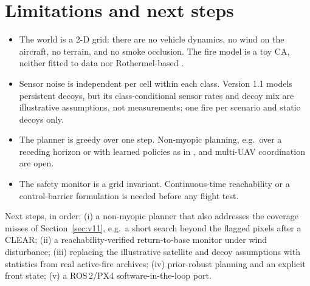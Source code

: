 \documentclass[10pt,a4paper]{article}
\begin{document}
\section{Limitations and next steps}
\begin{itemize}\setlength{\itemsep}{0pt}
\item The world is a 2-D grid: there are no vehicle dynamics, no wind on the aircraft, no terrain, and no smoke occlusion. The fire model is a toy CA, neither fitted to data nor Rothermel-based \citep{rothermel1972}.
\item Sensor noise is independent per cell within each class. Version 1.1 models persistent decoys, but its class-conditional sensor rates and decoy mix are illustrative assumptions, not measurements; one fire per scenario and static decoys only.
\item The planner is greedy over one step. Non-myopic planning, e.g.\ over a receding horizon or with learned policies as in \citet{julian2019}, and multi-UAV coordination are open.
\item The safety monitor is a grid invariant. Continuous-time reachability or a control-barrier formulation is needed before any flight test.
\end{itemize}
Next steps, in order: (i) a non-myopic planner that also addresses the coverage misses of Section~\ref{sec:v11}, e.g.\ a short search beyond the flagged pixels after a CLEAR; (ii) a reachability-verified return-to-base monitor under wind disturbance; (iii) replacing the illustrative satellite and decoy assumptions with statistics from real active-fire archives; (iv) prior-robust planning and an explicit front state; (v) a ROS\,2/PX4 software-in-the-loop port.
\end{document}
